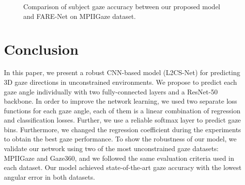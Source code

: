 \documentclass{article}
\begin{document}
\begin{figure}[t]
    \centering
{}
\caption{Comparison of subject gaze accuracy between our proposed model and FARE-Net \cite{farenet} on MPIIGaze dataset.}
\label{fig:4}
\end{figure}






\section{Conclusion}
\label{sec:conclusion}
In this paper, we present a robust CNN-based model (L2CS-Net) for predicting 3D gaze directions in unconstrained environments. We propose to predict each gaze angle individually with two fully-connected layers and a ResNet-50 backbone. In order to improve the network learning, we used two separate loss functions for each gaze angle, each of them is a linear combination of regression and classification losses. Further, we use a reliable softmax layer to predict gaze bins. Furthermore, we changed the regression coefficient during the experiments to obtain the best gaze performance. To show the robustness of our model, we validate our network using two of the most unconstrained gaze datasets: MPIIGaze and Gaze360, and we followed the same evaluation criteria used in each dataset. Our model achieved state-of-the-art gaze accuracy with the lowest angular error in both datasets.






\end{document}

